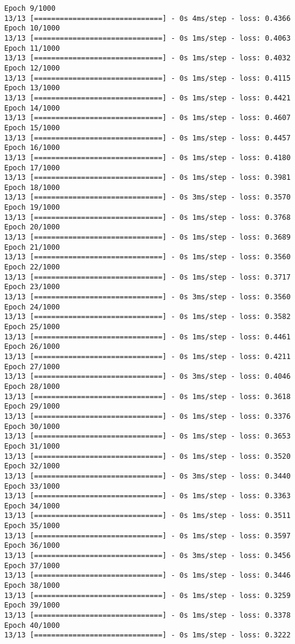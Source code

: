 \documentclass[11pt]{article}
\begin{document}
\begin{Verbatim}[commandchars=\\\{\}]
Epoch 9/1000
13/13 [==============================] - 0s 4ms/step - loss: 0.4366
Epoch 10/1000
13/13 [==============================] - 0s 1ms/step - loss: 0.4063
Epoch 11/1000
13/13 [==============================] - 0s 1ms/step - loss: 0.4032
Epoch 12/1000
13/13 [==============================] - 0s 1ms/step - loss: 0.4115
Epoch 13/1000
13/13 [==============================] - 0s 1ms/step - loss: 0.4421
Epoch 14/1000
13/13 [==============================] - 0s 1ms/step - loss: 0.4607
Epoch 15/1000
13/13 [==============================] - 0s 1ms/step - loss: 0.4457
Epoch 16/1000
13/13 [==============================] - 0s 1ms/step - loss: 0.4180
Epoch 17/1000
13/13 [==============================] - 0s 1ms/step - loss: 0.3981
Epoch 18/1000
13/13 [==============================] - 0s 3ms/step - loss: 0.3570
Epoch 19/1000
13/13 [==============================] - 0s 1ms/step - loss: 0.3768
Epoch 20/1000
13/13 [==============================] - 0s 1ms/step - loss: 0.3689
Epoch 21/1000
13/13 [==============================] - 0s 1ms/step - loss: 0.3560
Epoch 22/1000
13/13 [==============================] - 0s 1ms/step - loss: 0.3717
Epoch 23/1000
13/13 [==============================] - 0s 3ms/step - loss: 0.3560
Epoch 24/1000
13/13 [==============================] - 0s 1ms/step - loss: 0.3582
Epoch 25/1000
13/13 [==============================] - 0s 1ms/step - loss: 0.4461
Epoch 26/1000
13/13 [==============================] - 0s 1ms/step - loss: 0.4211
Epoch 27/1000
13/13 [==============================] - 0s 3ms/step - loss: 0.4046
Epoch 28/1000
13/13 [==============================] - 0s 1ms/step - loss: 0.3618
Epoch 29/1000
13/13 [==============================] - 0s 1ms/step - loss: 0.3376
Epoch 30/1000
13/13 [==============================] - 0s 1ms/step - loss: 0.3653
Epoch 31/1000
13/13 [==============================] - 0s 1ms/step - loss: 0.3520
Epoch 32/1000
13/13 [==============================] - 0s 3ms/step - loss: 0.3440
Epoch 33/1000
13/13 [==============================] - 0s 1ms/step - loss: 0.3363
Epoch 34/1000
13/13 [==============================] - 0s 1ms/step - loss: 0.3511
Epoch 35/1000
13/13 [==============================] - 0s 1ms/step - loss: 0.3597
Epoch 36/1000
13/13 [==============================] - 0s 3ms/step - loss: 0.3456
Epoch 37/1000
13/13 [==============================] - 0s 1ms/step - loss: 0.3446
Epoch 38/1000
13/13 [==============================] - 0s 1ms/step - loss: 0.3259
Epoch 39/1000
13/13 [==============================] - 0s 1ms/step - loss: 0.3378
Epoch 40/1000
13/13 [==============================] - 0s 1ms/step - loss: 0.3222

\end{Verbatim}
\end{document}
